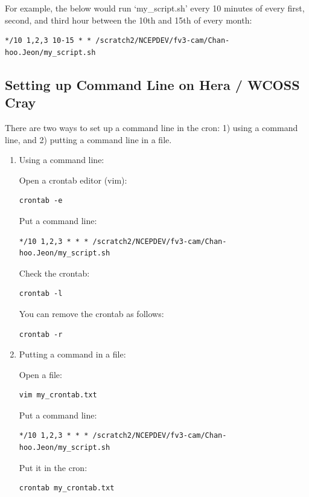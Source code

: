 \documentclass[11pt,fleqn]{report}              %
\begin{document}
For example, the below would run `my\_script.sh' every 10 minutes of every first, second, and third hour between the 10th and 15th of every month:
\lstset{language=bash}   
\begin{lstlisting}[frame=trBL]
*/10 1,2,3 10-15 * * /scratch2/NCEPDEV/fv3-cam/Chan-hoo.Jeon/my_script.sh
\end{lstlisting}


\subsection{Setting up Command Line on Hera / WCOSS Cray}
\label{subsec:cron_command_cray}

There are two ways to set up a command line in the cron: 1) using a command line, and 2) putting a command line in a file.
\begin{enumerate}
\item Using a command line:

Open a crontab editor (vim):
\lstset{language=bash}   
\begin{lstlisting}[frame=trBL]
crontab -e
\end{lstlisting}

Put a command line:
\lstset{language=bash}   
\begin{lstlisting}[frame=trBL]
*/10 1,2,3 * * * /scratch2/NCEPDEV/fv3-cam/Chan-hoo.Jeon/my_script.sh
\end{lstlisting}

Check the crontab:
\lstset{language=bash}   
\begin{lstlisting}[frame=trBL]
crontab -l
\end{lstlisting}

You can remove the crontab as follows:
\lstset{language=bash}   
\begin{lstlisting}[frame=trBL]
crontab -r
\end{lstlisting}


\item Putting a command in a file:

Open a file:
\lstset{language=bash}   
\begin{lstlisting}[frame=trBL]
vim my_crontab.txt
\end{lstlisting}

Put a command line:
\lstset{language=bash}   
\begin{lstlisting}[frame=trBL]
*/10 1,2,3 * * * /scratch2/NCEPDEV/fv3-cam/Chan-hoo.Jeon/my_script.sh
\end{lstlisting}

Put it in the cron:
\lstset{language=bash}   
\begin{lstlisting}[frame=trBL]
crontab my_crontab.txt
\end{lstlisting}

\end{enumerate}
\end{document}
